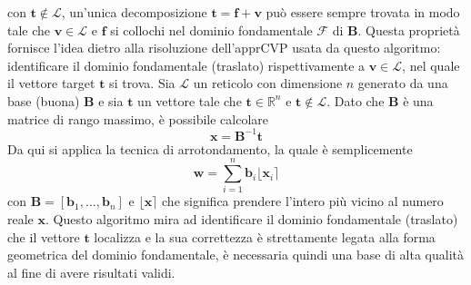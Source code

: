 con $\mathbf{t} \notin \mathcal{L}$, un'unica decomposizione $\mathbf{t} = \mathbf{f} + \mathbf{v}$
può essere sempre trovata in modo tale che $\mathbf{v} \in \mathcal{L}$ e $\mathbf{f}$ si collochi
nel dominio fondamentale $\mathcal{F}$ di $\mathbf{B}$. Questa proprietà fornisce l'idea
dietro alla risoluzione dell'apprCVP usata da questo algoritmo: identificare il dominio fondamentale (traslato) rispettivamente
a $\mathbf{v} \in \mathcal{L}$, nel quale il vettore target $\mathbf{t}$ si trova. 
Sia $\mathcal{L}$ un reticolo con 
dimensione $n$ generato da una base (buona) $\mathbf{B}$ e sia $\mathbf{t}$ un vettore tale che
$\mathbf{t} \in \mathbb{R}^n$ e $\mathbf{t} \notin \mathcal{L}$. Dato che $\mathbf{B}$ è una
matrice di rango massimo, è possibile calcolare
\[
    \mathbf{x} =  \mathbf{B}^{-1}\mathbf{t}
\]
Da qui si applica la tecnica di arrotondamento, la quale è semplicemente
\[
    \mathbf{w} = \sum_{i=1}^{n} \mathbf{b}_i \lfloor \mathbf{x}_i \rceil 
\]
con $\mathbf{B} = [\mathbf{b}_1,\dots,\mathbf{b}_n]$ e $\lfloor\mathbf{x}\rceil$ che significa
prendere l'intero più vicino al numero reale $\mathbf{x}$. Questo algoritmo mira ad 
identificare il dominio fondamentale (traslato) che il vettore $\mathbf{t}$ localizza e la sua
correttezza è strettamente legata alla forma geometrica del dominio fondamentale, è necessaria
quindi una base di alta qualità al fine di avere risultati validi. 

